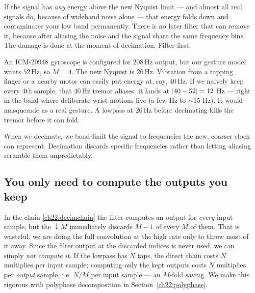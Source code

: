 \begin{trapbox}
If
the signal has \emph{any} energy above the new Nyquist limit --- and almost all
real signals do, because of wideband noise alone --- that energy folds down and
contaminates your low band permanently. There is no later filter that can remove
it, because after aliasing the noise and the signal share the same frequency
bins. The damage is done at the moment of decimation. Filter first.
\end{trapbox}

\begin{example}
\label{ch22:ex-imu}
An ICM-20948 gyroscope is configured for $208$\,Hz output, but our gesture model
wants $52$\,Hz, so $M = 4$. The new Nyquist is $26$\,Hz. Vibration from a tapping
finger or a nearby motor can easily put energy at, say, $40$\,Hz. If we naively
keep every 4th sample, that $40$\,Hz tremor aliases: it lands at
$\lvert40 - 52\rvert = 12$ Hz --- right in the band where deliberate wrist motions
live (a few Hz to $\sim 15$ Hz). It would masquerade as a real gesture. A
lowpass at $26$\,Hz before decimating kills the tremor before it can fold.
\end{example}

\begin{happeningbox}
When we decimate, we band-limit the signal to frequencies the new, coarser clock can represent. Decimation discards specific frequencies rather than letting aliasing scramble them unpredictably.
\end{happeningbox}

\subsection{You only need to compute the outputs you keep}

In the chain
\eqref{ch22:decimchain} the filter computes an output for \emph{every} input
sample, but the $\downarrow M$ immediately discards $M-1$ of every $M$ of them.
That is wasteful: we are doing the full convolution at the high rate only to
throw most of it away. Since the filter output at the discarded indices is never
used, we can simply \emph{not compute it}. If the lowpass has $N$ taps, the
direct chain costs $N$ multiplies per input sample; computing only the kept
outputs costs $N$ multiplies per \emph{output} sample, i.e. $N/M$ per input
sample --- an $M$-fold saving. We make this rigorous with polyphase
decomposition in Section~\ref{ch22:polyphase}.

